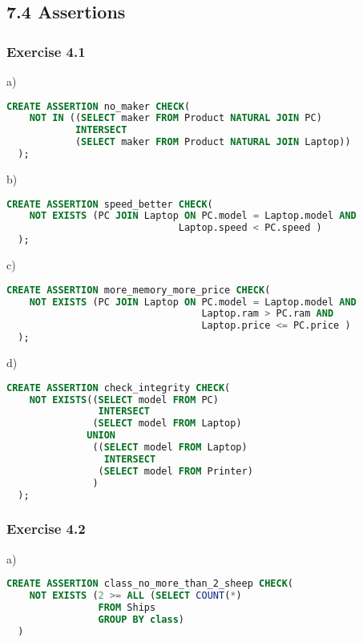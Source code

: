 \documentclass[../../main.tex]{subfiles}
\begin{document}
\subsection{7.4 Assertions}

\subsubsection*{Exercise 4.1}

a)

\begin{lstlisting}[language=sql]
  CREATE ASSERTION no_maker CHECK(
    NOT IN ((SELECT maker FROM Product NATURAL JOIN PC)
            INTERSECT
            (SELECT maker FROM Product NATURAL JOIN Laptop))
  );
\end{lstlisting}

b)

\begin{lstlisting}[language=sql]
  CREATE ASSERTION speed_better CHECK(
    NOT EXISTS (PC JOIN Laptop ON PC.model = Laptop.model AND
                              Laptop.speed < PC.speed )
  );
\end{lstlisting}

c)

\begin{lstlisting}[language=sql]
  CREATE ASSERTION more_memory_more_price CHECK(
    NOT EXISTS (PC JOIN Laptop ON PC.model = Laptop.model AND
                                  Laptop.ram > PC.ram AND
                                  Laptop.price <= PC.price )
  );
\end{lstlisting}

d)

\begin{lstlisting}[language=sql]
  CREATE ASSERTION check_integrity CHECK(
    NOT EXISTS((SELECT model FROM PC)
                INTERSECT
               (SELECT model FROM Laptop)
              UNION
               ((SELECT model FROM Laptop)
                 INTERSECT
                (SELECT model FROM Printer)
               )
  );
\end{lstlisting}

\subsubsection*{Exercise 4.2}

a)

\begin{lstlisting}[language=sql]
  CREATE ASSERTION class_no_more_than_2_sheep CHECK(
    NOT EXISTS (2 >= ALL (SELECT COUNT(*)
                FROM Ships
                GROUP BY class)
  )
\end{lstlisting}
\end{document}

